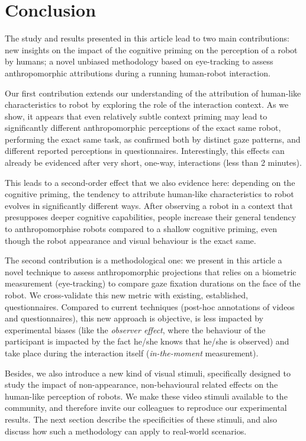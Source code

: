\documentclass[lettersize, noapacite, twoside, HRI]{apa_HRI}
\begin{document}
\section{Conclusion}

The study and results presented in this article lead to two main contributions:
new insights on the impact of the cognitive priming on the perception of a robot
by humans; a novel unbiased methodology based on eye-tracking to assess
anthropomorphic attributions during a running human-robot interaction.

Our first contribution extends our understanding of the attribution of
human-like characteristics to robot by exploring the role of the interaction
context. As we show, it appears that even relatively subtle context
priming may lead to significantly different anthropomorphic perceptions of
the exact same robot, performing the exact same task, as confirmed both by
distinct gaze patterns, and different reported perceptions in questionnaires.
Interestingly, this effects can already be evidenced after very short,
one-way, interactions (less than 2 minutes).

This leads to a second-order effect that we also evidence here: depending on the
cognitive priming, the tendency to attribute human-like characteristics to robot
evolves in significantly different ways. After observing a robot in a
context that presupposes deeper cognitive capabilities, people increase
their general tendency to anthropomorphise robots compared to a shallow
cognitive priming, even though the robot appearance and visual behaviour is the
exact same.

The second contribution is a methodological one: we present in this article
a novel technique to assess anthropomorphic projections that relies on a
biometric measurement (eye-tracking) to compare gaze fixation durations on
the face of the robot. We cross-validate this new metric with existing,
established, questionnaires. Compared to current techniques (post-hoc
annotations of videos and questionnaires), this new approach is objective,
is less impacted by experimental biases (like the \emph{observer effect},
where the behaviour of the participant is impacted by the fact he/she knows that
he/she is observed) and take place during the interaction itself
(\emph{in-the-moment} measurement).

Besides, we also introduce a new kind of visual stimuli, specifically designed
to study the impact of non-appearance, non-behavioural related effects on the
human-like perception of robots. We make these video stimuli available to the
community, and therefore invite our colleagues to reproduce our experimental
results. The next section describe the specificities of these stimuli, and also
discuss how such a methodology can apply to real-world scenarios.
\end{document}
